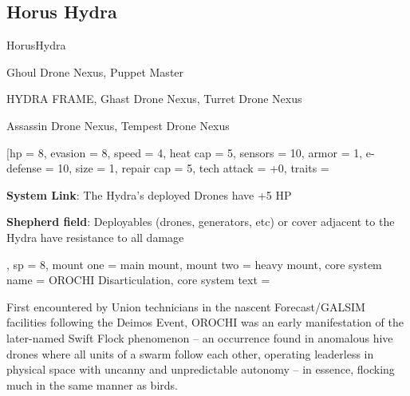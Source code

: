 \subsection{Horus Hydra}

\begin{mech}{Horus}{Hydra}


\begin{license}
\item Ghoul Drone Nexus, Puppet Master
\item HYDRA FRAME, Ghast Drone Nexus, Turret Drone Nexus
\item Assassin Drone Nexus, Tempest Drone Nexus
\end{license}


\frameBox
[hp = 8,
evasion = 8,
speed = 4,
heat cap = 5,
sensors = 10,
armor = 1,
e-defense = 10,
size = 1,
repair cap = 5,
tech attack = +0,
traits = {\textbf{System Link}: The Hydra’s deployed Drones have +5 HP

\textbf{Shepherd field}: Deployables (drones, generators, etc) or cover adjacent to the Hydra have resistance to all damage},
sp = 8,
mount one = main mount,
mount two = heavy mount,
core system name = OROCHI Disarticulation,
core system text = {First encountered by Union technicians in the nascent Forecast/GALSIM facilities following the Deimos Event, OROCHI was an early manifestation of the later-named Swift Flock phenomenon -- an occurrence found in anomalous hive drones where all units of a swarm follow each other, operating leaderless in physical space with uncanny and unpredictable autonomy -- in essence, flocking much in the same manner as birds.

}
\end{mech}
